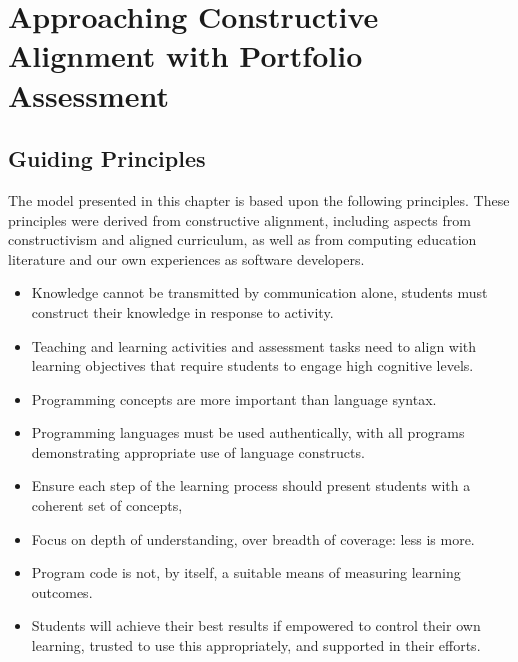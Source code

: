
\chapter{Approaching Constructive Alignment with Portfolio Assessment} %
\label{cha:approach}

\graphicspath{{Figures/CAApproach/}}

\section{Guiding Principles} %
\label{sec:guiding_principles}

The model presented in this chapter is based upon the following principles. These  principles were derived from constructive alignment, including aspects from constructivism and aligned curriculum, as well as from computing education literature and our own experiences as software developers.

\begin{itemize}
	\item Knowledge cannot be transmitted by communication alone, students must construct their knowledge in response to activity.
	\item Teaching and learning activities and assessment tasks need to align with learning objectives that require students to engage high cognitive levels.
	\item Programming concepts are more important than language syntax.
	\item Programming languages must be used authentically, with all programs demonstrating appropriate use of language constructs.
	\item Ensure each step of the learning process should present students with a coherent set of concepts, 
	\item Focus on depth of understanding, over breadth of coverage: less is more.
	\item Program code is not, by itself, a suitable means of measuring learning outcomes.
	\item Students will achieve their best results if empowered to control their own learning, trusted to use this appropriately, and supported in their efforts.
\end{itemize}

